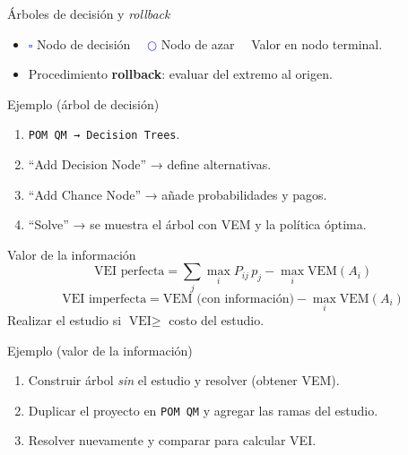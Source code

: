 \documentclass{beamer}
\begin{document}
\begin{frame}{Árboles de decisión y \textit{rollback}}
  \begin{itemize}
    \item \textcolor{blue}{$\square$} Nodo de decisión 
          \textcolor{blue}{$\bigcirc$} Nodo de azar 
          Valor en nodo terminal.
    \item Procedimiento \textbf{rollback}: evaluar del extremo al origen.
  \end{itemize}
\end{frame}

\begin{frame}{Ejemplo (árbol de decisión)}
  \begin{enumerate}\footnotesize
    \item \texttt{POM QM → Decision Trees}.
    \item “Add Decision Node” → define alternativas.
    \item “Add Chance Node” → añade probabilidades y pagos.
    \item “Solve” → se muestra el árbol con VEM y la política óptima.
  \end{enumerate}
\end{frame}

\begin{frame}{Valor de la información}
  \[
    \text{VEI perfecta}=
      \sum_j\max_i P_{ij}\,p_j-\max_i\text{VEM}(A_i)
  \]
  \[
    \text{VEI imperfecta}=
      \text{VEM (con información)}-\max_i\text{VEM}(A_i)
  \]
  Realizar el estudio si \(\text{VEI} \ge\) costo del estudio.
\end{frame}

\begin{frame}{Ejemplo (valor de la información)}
  \begin{enumerate}\footnotesize
    \item Construir árbol \emph{sin} el estudio y resolver (obtener VEM).
    \item Duplicar el proyecto en \texttt{POM QM} y agregar las ramas del estudio.
    \item Resolver nuevamente y comparar para calcular VEI.
  \end{enumerate}
\end{frame}
\end{document}
